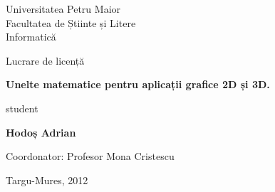 

\pagestyle{empty}
\sffamily

\noindent
\begin{center}
    \Large
    Universitatea Petru Maior\\
    Facultatea de Știinte și Litere\\
    Informatică
\end{center}

\vfill\vfill
\begin{center}
    \large
    Lucrare de licență\\
\end{center}

\vfill
\begin{center}
    \Huge\bfseries
    Unelte matematice pentru aplicații grafice 2D și 3D.
\end{center}

\vfill
\begin{center}
    \Large
    student
\end{center}

\vfill
\begin{center}
    \huge\bfseries
    Hodoș Adrian
\end{center}

\vfill\vfill\vfill
\begin{center}
    \Large
    Coordonator: Profesor Mona Cristescu
\end{center}

\vfill
\begin{center}
\large
    Targu-Mures, 2012
\end{center}

\cleardoublepage


\rmfamily
\normalfont

\pagestyle{headings}
\tableofcontents

